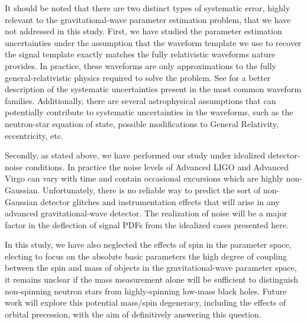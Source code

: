 \documentclass[11pt,a4paper]{emulateapj} 
\begin{document}
It should be noted that there are two distinct types of systematic
error, highly relevant to the gravitational-wave parameter estimation
problem, that we have not addressed in this study.  First, we have
studied the parameter estimation uncertainties under the assumption
that the waveform template we use to recover the signal template
exactly matches the fully relativistic waveforms nature provides.  In
practice, these waveforms are only approximations to the fully
general-relativistic physics required to solve the problem.  See
\cite{BuonannoWaveform} for a better description of the systematic uncertainties
present in the most common waveform families.  Additionally, there are
several astrophysical assumptions that can potentially contribute to
systematic uncertainties in the waveforms, such as the neutron-star
equation of state, possible modifications to General Relativity,
eccentricity, etc.

Secondly, as stated above, we have performed our study under idealized
detector-noise conditions.  In practice the noise levels of Advanced
LIGO and Advanced Virgo can vary with time and contain occasional
excursions which are highly non-Gaussian.  Unfortunately, there is no
reliable way to predict the sort of non-Gaussian detector glitches and
instrumentation effects that will arise in any advanced
gravitational-wave detector.  The realization of noise will be a
major factor in the deflection of signal PDFs from the idealized cases
presented here.

In this study, we have also neglected the effects of spin in the
parameter space, electing to focus on the absolute basic parameters
the high degree of coupling between the spin and mass of objects
in the gravitational-wave parameter space, it remains unclear if the
mass measurement alone will be sufficient to distinguish non-spinning
neutron stars from highly-spinning low-mass black holes.  Future work
will explore this potential mass/spin degeneracy, including the
effects of orbital precession, with the aim of definitively answering
this question.

 {}
\end{document}
